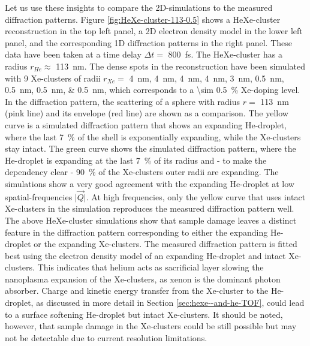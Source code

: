 Let us use these insights to compare the 2D-simulations to the measured diffraction patterns. Figure \ref{fig:HeXe-cluster-113-0.5} shows a HeXe-cluster reconstruction in the top left panel, a 2D electron density model in the lower left panel, and the corresponding 1D diffraction patterns in the right panel. These data have been taken at a time delay $\Delta t=$ \SI{800}{\femto\second}. The HeXe-cluster has a radius $r_{He}\approx$ \SI{113}{\nano\meter}. The dense spots in the reconstruction have been simulated with \num{9} Xe-clusters of radii $r_{Xe}=$ \SIlist{4;4;4;4;3;0.5;0.5;0.5;0.5}{\nano\meter}, which corresponds to a \SI{\sim 0.5}{\percent} Xe-doping level. In the diffraction pattern, the scattering of a sphere with radius $r=$ \SI{113}{\nano\meter} (pink line) and its envelope (red line) are shown as a comparison. The yellow curve is a simulated diffraction pattern that shows an expanding He-droplet, where the last \SI{7}{\percent} of the shell is exponentially expanding, while the Xe-clusters stay intact. The green curve shows the simulated diffraction pattern, where the He-droplet is expanding at the last \SI{7}{\percent} of its radius and - to make the dependency clear - \SI{90}{\percent} of the Xe-clusters outer radii are expanding. The simulations show a very good agreement with the expanding He-droplet at low spatial-frequencies $\lvert\vec{Q}\rvert$. At high frequencies, only the yellow curve that uses intact Xe-clusters in the simulation reproduces the measured diffraction pattern well.\\[1\baselineskip]
%
The above HeXe-cluster simulations show that sample damage leaves a distinct feature in the diffraction pattern corresponding to either the expanding He-droplet or the expanding Xe-clusters. The measured diffraction pattern is fitted best using the electron density model of an expanding He-droplet and intact Xe-clusters. This indicates that helium acts as sacrificial layer slowing the nanoplasma expansion of the Xe-clusters, as xenon is the dominant photon absorber. Charge and kinetic energy transfer \cite{Hau-Riege-2007-PRL,Hoener-2008-JPB} from the Xe-cluster to the He-droplet, as discussed in more detail in Section \ref{sec:hexe--and-he-TOF}, could lead to a surface softening He-droplet but intact Xe-clusters. It should be noted, however, that sample damage in the Xe-clusters could be still possible but may not be detectable due to current resolution limitations.
%
%
%
%

